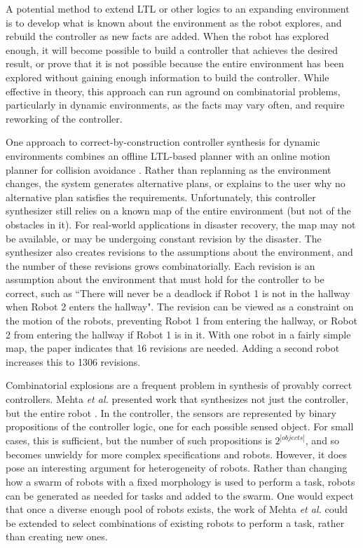 A potential method to extend LTL or other logics to an expanding environment is to develop what is known about the environment as the robot explores, and rebuild the controller as new facts are added. 
When the robot has explored enough, it will become possible to build a controller that achieves the desired result, or prove that it is not possible because the entire environment has been explored without gaining enough information to build the controller. 
While effective in theory, this approach can run aground on combinatorial problems, particularly in dynamic environments, as the facts may vary often, and require reworking of the controller. 

One approach to correct-by-construction controller synthesis for dynamic environments combines an offline LTL-based planner with an online motion planner for collision avoidance \citep{alonso2018reactive}. 
Rather than replanning as the environment changes, the system generates alternative plans, or explains to the user why no alternative plan satisfies the requirements.  
Unfortunately, this controller synthesizer still relies on a known map of the entire environment (but not of the obstacles in it). 
For real-world applications in disaster recovery, the map may not be available, or may be undergoing constant revision by the disaster. 
The synthesizer also creates revisions to the assumptions about the environment, and the number of these revisions grows combinatorially. 
Each revision is an assumption about the environment that must hold for the controller to be correct, such as ``There will never be a deadlock if Robot 1 is not in the hallway when Robot 2 enters the hallway".
The revision can be viewed as a constraint on the motion of the robots, preventing Robot 1 from entering the hallway, or Robot 2 from entering the hallway if Robot 1 is in it. 
With one robot in a fairly simple map, the paper indicates that 16 revisions are needed. 
Adding a second robot increases this to 1306 revisions.  

Combinatorial explosions are a frequent problem in synthesis of provably correct controllers. 
Mehta \emph{et al.} presented work that synthesizes not just the controller, but the entire robot \citep{mehta2018robot}.
In the controller, the sensors are represented by binary propositions of the controller logic, one for each possible sensed object.
For small cases, this is sufficient, but the number of such propositions is $2^{|objects|}$, and so becomes unwieldy for more complex specifications and robots.  
However, it does pose an interesting argument for heterogeneity of robots. 
Rather than changing how a swarm of robots with a fixed morphology is used to perform a task, robots can be generated as needed for tasks and added to the swarm. 
One would expect that once a diverse enough pool of robots exists, the work of Mehta \emph{et al.} could be extended to select combinations of existing robots to perform a task, rather than creating new ones. 

